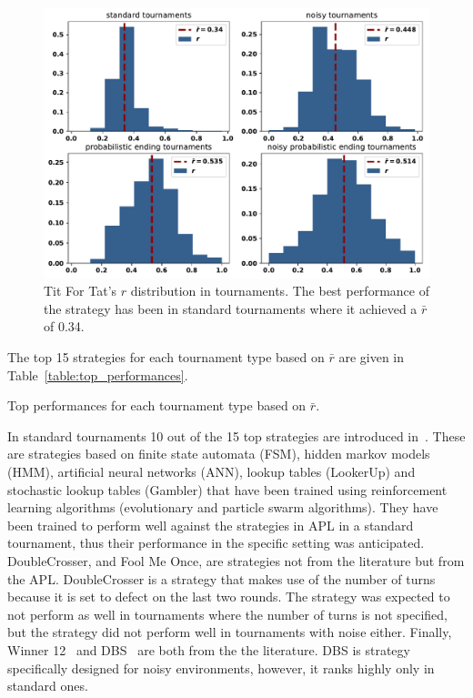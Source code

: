 \documentclass{article}
\begin{document}
\begin{figure}[!htbp]
    \centering
    \includegraphics[width=.6\textwidth]{../images/tit_for_tat_r_distributions.pdf}
    \caption{Tit For Tat's $r$ distribution in tournaments. The best performance
    of the strategy has been in standard tournaments where it achieved a $\bar{r}$
    of 0.34.}
    \label{fig:tit_for_tat_r_distribution}
\end{figure}

The top 15 strategies for each tournament type based on \(\bar{r}\) are given in
Table~\ref{table:top_performances}.

\begin{table}[!htbp]
    \begin{center}
    \resizebox{.9\textwidth}{!}{
        
    }
\end{center}
\caption{Top performances for each tournament type based on $\bar{r}$.}
\label{table:top_performances}
\end{table}

In standard tournaments 10 out of the 15 top strategies are introduced
in~\cite{Harper2017}. These are strategies based on finite state automata (FSM),
hidden markov models (HMM), artificial neural networks (ANN), lookup tables
(LookerUp) and stochastic lookup tables (Gambler) that have been trained using
reinforcement learning algorithms (evolutionary and particle swarm algorithms).
They have been trained to perform well against the strategies
in APL in a standard tournament, thus their performance in the
specific setting was anticipated. DoubleCrosser, and Fool Me Once, are
strategies not from the literature but from the APL. DoubleCrosser
is a strategy that makes use of the number of turns because it is set to defect on
the last two rounds. The strategy was expected to not perform as well in
tournaments where the number of turns is not specified, but the strategy did not
perform well in tournaments with noise either. Finally, Winner
12~\cite{mathieu2017} and DBS~\cite{Au2006} are both from the the literature.
DBS is strategy specifically designed for noisy environments, however, it ranks
highly only in standard ones.
\end{document}
